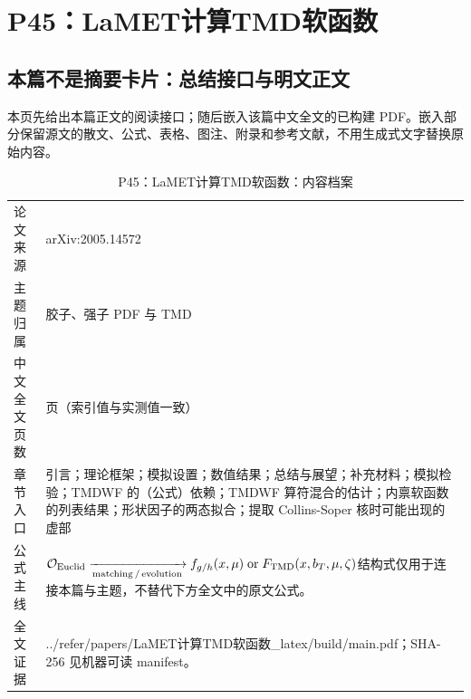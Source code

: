 \documentclass[UTF8,11pt,oneside]{ctexbook}
\begin{document}
\chapter{P45：LaMET计算TMD软函数}
\section*{本篇不是摘要卡片：总结接口与明文正文}
本页先给出本篇正文的阅读接口；随后嵌入该篇中文全文的已构建 PDF。嵌入部分保留源文的散文、公式、表格、图注、附录和参考文献，不用生成式文字替换原始内容。
\begin{table}[htbp]
  \centering
  \caption{P45：LaMET计算TMD软函数：内容档案}
  \small
  \begin{tabularx}{0.96\textwidth}{@{}p{3.3cm}>{\raggedright\arraybackslash}X@{}}
    \toprule
    论文来源 & arXiv:2005.14572 \\
    主题归属 & 胶子、强子 PDF 与 TMD \\
    中文全文页数 & 14 页（索引值与实测值一致） \\
    章节入口 & 引言；理论框架；模拟设置；数值结果；总结与展望；补充材料；模拟检验；TMDWF 的（公式）依赖；TMDWF 算符混合的估计；内禀软函数的列表结果；形状因子的两态拟合；提取 Collins-Soper 核时可能出现的虚部 \\
    公式主线 & $\mathcal O_{\rm Euclid}\xrightarrow[\rm matching\,/\,evolution]{}f_{g/h}(x,\mu)\;{\rm or}\;F_{\rm TMD}(x,b_T,\mu,\zeta)$\newline\scriptsize 结构式仅用于连接本篇与主题，不替代下方全文中的原文公式。 \\
    全文证据 & ../\allowbreak{}refer/\allowbreak{}papers/\allowbreak{}LaMET计算TMD软函数\_\allowbreak{}latex/\allowbreak{}build/\allowbreak{}main.pdf；SHA-256 见机器可读 manifest。 \\
    \bottomrule
  \end{tabularx}
\end{table}
\end{document}
